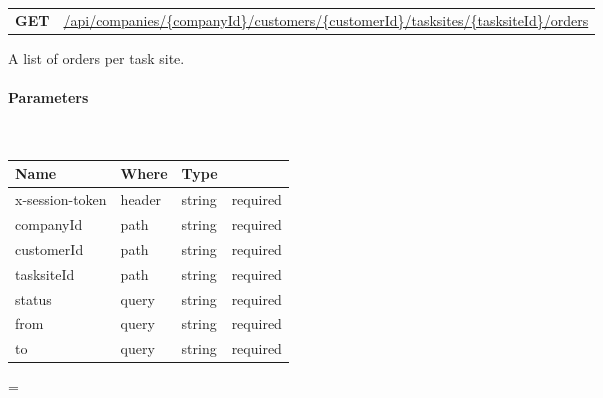 \documentclass[10pt]{article}
\newcommand{\method}[2]{
    \begin{mdframed}[style=#1]
        \color{white}
        \begin{tabularx}{\textwidth}{lX}
            \MakeUppercase{\textbf{#1}} & #2 \\
        \end{tabularx}
    \end{mdframed}
}
\newenvironment{absolutelynopagebreak}
  {\par\nobreak\vfil\penalty0\vfilneg
   \vtop\bgroup}
  {\par\xdef\tpd{\the\prevdepth}\egroup
   \prevdepth=\tpd}
\begin{document}
            \vspace{.5cm}
            \begin{absolutelynopagebreak}
                \label{route:681a20ee303c11ef1c25ab6a04af851f}
                \method{get}{\url{/api/companies/{companyId}/customers/{customerId}/tasksites/{tasksiteId}/orders}}

                \begin{flushleft}
                    A list of orders per task site.
                    \vspace{.25cm}

                    \paragraph{Parameters}\mbox{}\\
                    \vspace{.25cm}
                    \begin{tabularx}{\textwidth}{lXlr}
                        \textbf{Name} & \textbf{Where} & \textbf{Type} \\
                        \hline
                            x-session-token & header & string & required \\
                            companyId & path & string & required \\
                            customerId & path & string & required \\
                            tasksiteId & path & string & required \\
                            status & query & string & required \\
                            from & query & string & required \\
                            to & query & string & required \\
                    \end{tabularx}


\end{flushleft}
\end{absolutelynopagebreak}
\end{document}
